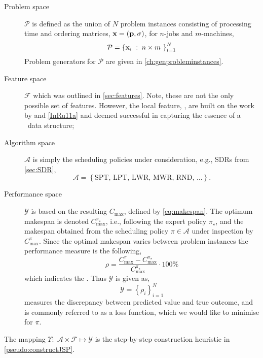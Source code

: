 \begin{description} 
    \item[Problem space] $\mathcal{P}$ is defined as the union of $N$ problem 
    instances consisting of processing time and ordering matrices, 
    $\mathbf{x}=(\mathbf{p},{\mathbf{\sigma}})$, for $n$-jobs and $m$-machines, 
    \begin{equation} 
    \mathcal{P}=\left\{\mathbf{x}_i\;:\;n\times m~\right\}_{i=1}^{N}
    \end{equation}
    Problem generators for $\mathcal{P}$ are given in 
    \cref{ch:genprobleminstances}.
    \item[Feature space] $\mathcal{F}$ which was outlined in 
    \cref{sec:features}. Note, these are not the only possible set of features. 
    However, the local feature, \phiLocalRelated, are built on the work by 
    \cite{SmithMilesLion3} and \cref{InRu11a} and deemed successful in 
    capturing the essence of a \jsp\ data structure;
    \item[Algorithm space] $\mathcal{A}$ is simply the scheduling policies 
    under consideration, e.g., SDRs from \cref{sec:SDR},
    \begin{equation}
    \mathcal{A}=\left\{\text{SPT,~LPT,~LWR,~MWR,~RND,~}\dotsc\right\}.
    \end{equation} 
    \item[Performance space] $\mathcal{Y}$ is based on the resulting 
    $C_{\max}$, defined by \cref{eq:makespan}. The optimum makespan is denoted 
    $C_{\max}^{\pi_\star}$, i.e., following the expert policy $\pi_\star$, and 
    the makespan obtained from the scheduling policy $\pi\in\mathcal{A}$ under 
    inspection by $C_{\max}^{\pi}$. 
    Since the optimal makespan varies between problem instances the performance 
    measure is the following, 
    \begin{equation}\label{eq:rho}
    \rho=\frac{C_{\max}^{\pi}-C_{\max}^{\pi_\star}}{C_{\max}^{\pi_\star}}\cdot
    100\%
    \end{equation}
    which indicates the \namerho. Thus $\mathcal{Y}$ is given as, 
    \begin{equation}
    \mathcal{Y}=\left\{\rho_i\right\}_{i=1}^{N}
    \end{equation}
     measures the discrepancy between predicted value and true 
    outcome, and is commonly referred to as a loss function, which we would 
    like to minimise for $\pi$.
\end{description}
The mapping $\Upsilon:\;\mathcal{A}\times\mathcal{F} \mapsto \mathcal{Y}$ is 
the step-by-step construction heuristic in \cref{pseudo:constructJSP}.